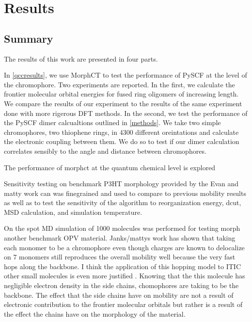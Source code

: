 \chapter{Results}
\label{results}

\section{Summary}

The results of this work are presented in four parts. 

In \autoref{qccresults}, we use MorphCT to test the performance of PySCF at the level of the chromophore.
Two experiments are reported. In the first, we calculate the frontier molecular orbital
energies for fused ring oligomers of increasing length. We compare the results of our experiment to the
results of the same experiment done with more rigerous DFT methods. In the second, we test the 
performance of the PySCF dimer calcualtions outlined in \autoref{methods}. 
We take two simple chromophores, two thiophene rings, in 4300 different oreintations and calculate the
electronic coupling between them. We do so to test if our dimer calculation correlates sensibly to the angle
and distance between chromophores.  

The performance of morphct at the quantum chemical level is explored 

Sensitivity testing on benchmark P3HT morphology provided by the Evan and matty work can was finegrained and
used to compare to previous mobility results as well as to test the sensitivity of the algorithm to
reorganization energy, dcut, MSD calculation, and simulation temperature. 

On the spot  MD simulation of 1000
molecules was performed for testing morph another benchmark OPV material. Janks/mattys  work has shown that taking
each monomer to be a chromophore even though charges are known to delocalize on 7 monomers still reproduces
the overall mobility well because the very fast hops along the backbone. I think the application of this
hopping model to ITIC other small molecules is even more justified . Knowing that the this molecule has
negligible electron density in the side chains, chomophores are taking to be the backbone. The effect that
the side chains have on mobility are not a result of electronic contribution to the frontier molecular
orbitals but rather is a result of the effect the chains have on the morphology of the material. 

